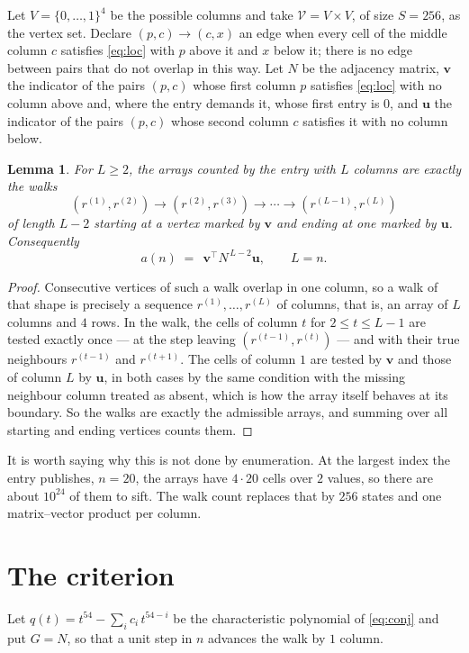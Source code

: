 \documentclass[11pt,a4paper]{article}
\theoremstyle{plain}
\newtheorem{lemma}[theorem]{Lemma}
\theoremstyle{definition}
\begin{document}
Let $V=\{0,\dots,1\}^{4}$ be the possible columns and take
$\mathcal V=V\times V$, of size $S=256$, as the vertex set. Declare $(p,c)\to(c,x)$ an edge
when every cell of the middle column $c$ satisfies \eqref{eq:loc} with $p$ above it and $x$
below it; there is no edge between pairs that do not overlap in this way. Let $N$ be the
adjacency matrix, $\mathbf{v}$ the indicator of the pairs $(p,c)$ whose first column $p$
satisfies \eqref{eq:loc} with no column above and, where the entry demands it, whose first entry is $0$, and $\mathbf{u}$ the indicator of
the pairs $(p,c)$ whose second column $c$ satisfies it with no column below.

\begin{lemma}\label{lem:walk}
For $L\ge2$, the arrays counted by the entry with $L$ columns are exactly the walks
\[
(r^{(1)},r^{(2)})\to(r^{(2)},r^{(3)})\to\cdots\to(r^{(L-1)},r^{(L)})
\]
of length $L-2$ starting at a vertex marked by $\mathbf{v}$ and ending at one marked by
$\mathbf{u}$. Consequently
\[
a(n)\;=\;\,\mathbf{v}^{\!\top}N^{\,L-2}\mathbf{u},\qquad L=n .
\]
\end{lemma}

\begin{proof}
Consecutive vertices of such a walk overlap in one column, so a walk of that shape is
precisely a sequence $r^{(1)},\dots,r^{(L)}$ of columns, that is, an array of $L$ columns
and $4$ rows. In the walk, the cells of column $t$ for $2\le t\le L-1$ are tested
exactly once --- at the step leaving $(r^{(t-1)},r^{(t)})$ --- and with their true
neighbours $r^{(t-1)}$ and $r^{(t+1)}$. The cells of column $1$ are tested by
$\mathbf{v}$ and those of column $L$ by $\mathbf{u}$, in both cases by the same condition
with the missing neighbour column treated as absent, which is how the array itself behaves at
its boundary. So the walks are exactly the admissible arrays, and summing over all starting
and ending vertices counts them.
\end{proof}


It is worth saying why this is not done by enumeration. At the largest index the entry
publishes, $n=20$, the arrays have $4\cdot20$ cells over
$2$ values, so there are about $10^{24}$ of them to sift. The
walk count replaces that by $256$ states and one matrix--vector product per column.
\section{The criterion}

Let $q(t)=t^{54}-\sum_i c_i\,t^{54-i}$ be the characteristic polynomial of
\eqref{eq:conj} and put $G=N$, so that a unit step in $n$ advances the walk by
$1$ column.
\end{document}
